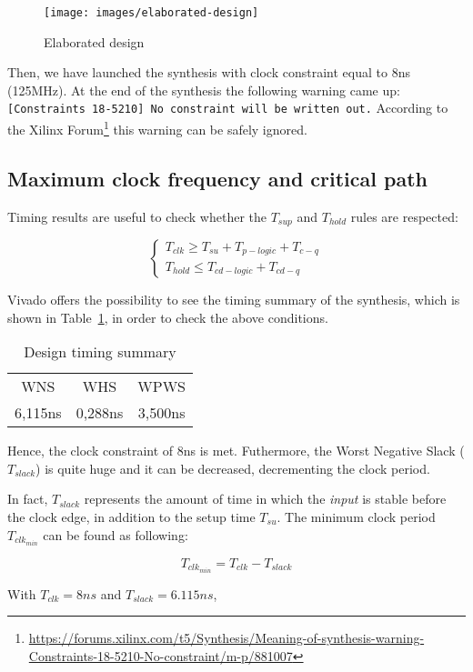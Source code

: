 \documentclass[11pt,a4paper,oneside, openright]{article}
\begin{document}
\begin{figure}[h]
    \centering
    \texttt{[image: images/elaborated-design]}
    \caption{Elaborated design}
    \label{fig:elaborated-design}
\end{figure}

Then, we have launched the synthesis with clock constraint equal to 8ns (125MHz). At the end of the synthesis the following warning came up: \texttt{[Constraints 18-5210] No constraint will be written out.} According to the Xilinx Forum\footnote{\url{https://forums.xilinx.com/t5/Synthesis/Meaning-of-synthesis-warning-Constraints-18-5210-No-constraint/m-p/881007}} this warning can be safely ignored.

\subsection{Maximum clock frequency and critical path}
Timing results are useful to check whether the $ T_{sup} $ and $ T_{hold} $ rules are respected:

$$ \begin{cases} T_{clk} \geq T_{su} + T_{p-logic} + T_{c-q} \\ T_{hold} \leq T_{cd-logic} + T_{cd-q} \end{cases} $$

Vivado offers the possibility to see the timing summary of the synthesis, which is shown in Table~\ref{tab:timing}, in order to check the above conditions.

\begin{table}[h]
    \centering
    \begin{tabular}{c c c}
        WNS & WHS & WPWS \\
        6,115ns & 0,288ns & 3,500ns
    \end{tabular}
    \caption{Design timing summary}
    \label{tab:timing}
\end{table}

Hence, the clock constraint of 8ns is met. Futhermore, the Worst Negative Slack ($T_{slack}$) is quite huge and it can be decreased, decrementing the clock period.

In fact, $T_{slack}$ represents the amount of time in which the \textit{input} is stable before the clock edge, in addition to the setup time $T_{su}$. The minimum clock period $T_{clk_{min}}$ can be found as following:

$$ T_{clk_{min}} = T_{clk} - T_{slack} $$

With $ T_{clk} = 8ns $ and $ T_{slack} = 6.115ns $, 
\end{document}
